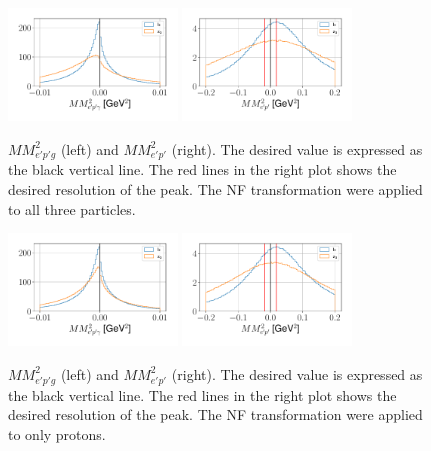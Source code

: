 \begin{figure}[htb]
    \centering
    \includegraphics[width=0.4\textwidth]{Chapters/Ch3-Simulations/normalizing_flows/pics/MeetingFigures/Sangbaek/MM2_epg.pdf}
    \includegraphics[width=0.4\textwidth]{Chapters/Ch3-Simulations/normalizing_flows/pics/MeetingFigures/Sangbaek/MM2_ep.pdf}
    \caption{$MM_{e'p'g}^2$ (left) and $MM_{e'p'}^2$ (right). The desired value is expressed as the black vertical line. The red lines in the right plot shows the desired resolution of the peak. The NF transformation were applied to all three particles.}
    \label{fig:allparticleNF}
\end{figure}

\begin{figure}[htb]
    \centering
    \includegraphics[width=0.4\textwidth]{Chapters/Ch3-Simulations/normalizing_flows/pics/MeetingFigures/Sangbaek/MM2_epg_proton.pdf}
    \includegraphics[width=0.4\textwidth]{Chapters/Ch3-Simulations/normalizing_flows/pics/MeetingFigures/Sangbaek/MM2_ep_proton.pdf}
    \caption{$MM_{e'p'g}^2$ (left) and $MM_{e'p'}^2$ (right). The desired value is expressed as the black vertical line. The red lines in the right plot shows the desired resolution of the peak. The NF transformation were applied to only protons.}
    \label{fig:protonNF}
\end{figure}
\clearpage

